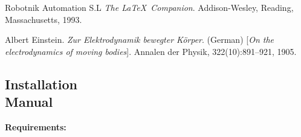 \documentclass[12pt, a4paper, twoside]{article}
\begin{document}
\begin{thebibliography}{9}
    Robotnik Automation S.L
    \textit{The \LaTeX\ Companion}. 
    Addison-Wesley, Reading, Massachusetts, 1993.
    
    Albert Einstein. 
    \textit{Zur Elektrodynamik bewegter K{\"o}rper}. (German) 
    [\textit{On the electrodynamics of moving bodies}]. 
    Annalen der Physik, 322(10):891–921, 1905.
\end{thebibliography}

\newpage

\begin{umaappendices}
\section{Installation \\ Manual}
    
    \textbf{\large{Requirements:}}

\end{umaappendices}
\end{document}
